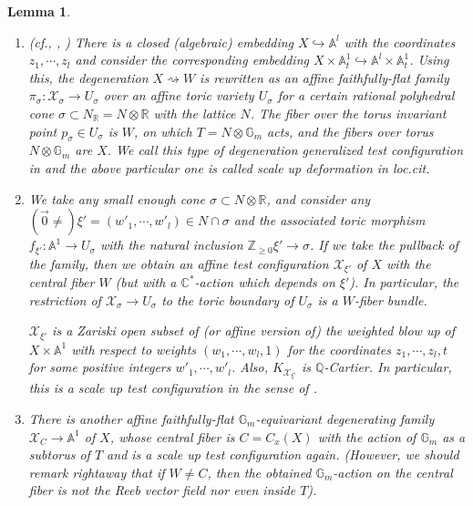 \documentclass[12pt,a4paper]{amsart}
\newtheorem{Lem}[Thm]{Lemma}
\theoremstyle{remark}
\theoremstyle{definition}
\def\R{\mathbb{R}}
\def\C{\mathbb{C}}
\def\G{\mathbb{G}}
\def\Z{\mathbb{Z}}
\def\Q{\mathbb{Q}}
\def\A{\mathbb{A}}
\def\X{\mathcal{X}}
\begin{document}
\begin{Lem}\label{XtoW.C}
\begin{enumerate}

\item (cf., \cite[\S 3]{LX}, \cite[Theorem 2.12]{Od24b})
There is a closed (algebraic) 
embedding $X\hookrightarrow \A^l$ 
with the coordinates $z_1,\cdots,z_l$ and 
consider the corresponding embedding 
$X\times \A^1_t\hookrightarrow \A^l\times \A^1_t$. 
Using this, the degeneration $X\rightsquigarrow W$ is rewritten as an 
affine faithfully-flat family 
$\pi_\sigma\colon \mathcal{X}_\sigma\to U_\sigma$ 
over an affine toric variety $U_\sigma$ 
for a certain rational polyhedral cone $\sigma\subset N_{\R}=N\otimes \R$ with the lattice $N$.  
The fiber over the torus invariant point $p_\sigma\in U_\sigma$ is $W$, on which $T=N\otimes \mathbb{G}_m$ acts, 
and the fibers over torus $N\otimes \G_m$ are $X$. 
We call this type of degeneration {\it generalized test configuration} in \cite[\S 2]{Od24b} 
and the above particular one is called scale up deformation in {\it loc.cit}. 


\item \label{W.wtedblowup}


We take any small 
enough cone $\sigma\subset N\otimes \R$, 
and consider any $(\vec{0}\neq)\xi'=(w'_1,\cdots,w'_l)\in N\cap \sigma$ and the 
associated toric morphism $f_{\xi'}\colon \A^1\to U_\sigma$ 
with the natural inclusion $\Z_{\ge 0} \xi' \to \sigma$. 
If we take the pullback of the family, then we obtain an affine test configuration $\mathcal{X}_{\xi'}$ 
of $X$ with the central fiber $W$ 
(but with a $\C^*$-action which depends on $\xi'$). 
In particular, the restriction of 
$\X_{\sigma} \to U_{\sigma}$ 
to the toric boundary of $U_\sigma$ is a $W$-fiber bundle. 

$\X_{\xi'}$ is a Zariski open subset of (or affine version of) 
the weighted blow up of $X\times \A^1$ 
with respect to weights $(w_1,\cdots,w_l,1)$ 
for the coordinates $z_1,\cdots,z_l,t$ for some positive 
integers $w'_1,\cdots,w'_l$. 
Also, $K_{\X_{\xi'}}$ is $\Q$-Cartier. 
In particular, this is a scale up test configuration 
in the sense of \cite[\S 2]{Od24b}. 

\item \label{C.wtedblowup}

There is another affine faithfully-flat 
$\G_m$-equivariant degenerating family 
$\X_C\to \A^1$ of $X$, whose central fiber is 
$C=C_x(X)$ with the action of $\G_m$ as a subtorus of $T$ 
and is a scale up test configuration again.  
(However, we should remark 
rightaway that if $W\neq C$, then the 
obtained $\G_m$-action on the central fiber is 
not the Reeb vector field nor even inside $T$). 

\end{enumerate}
\end{Lem}
\end{document}
